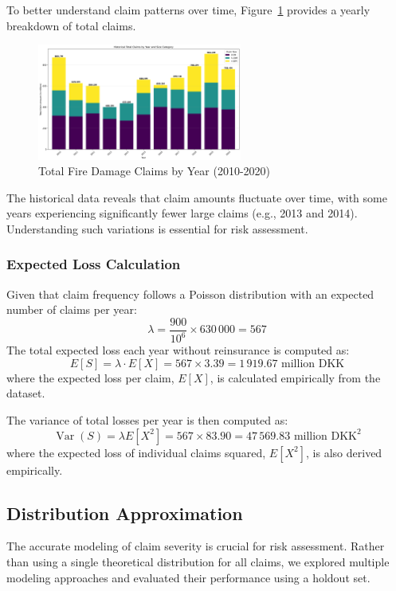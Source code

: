 \documentclass[8pt]{article}
\begin{document}
To better understand claim patterns over time, Figure~\ref{fig:historical-year} provides a yearly breakdown of total claims.

\begin{figure}[h]
    \centering
    \includegraphics[width=0.6\textwidth]{Figures/historical_year_comparison.png}
    \caption{Total Fire Damage Claims by Year (2010-2020)}
    \label{fig:historical-year}
\end{figure}

The historical data reveals that claim amounts fluctuate over time, with some years experiencing significantly fewer large claims (e.g., 2013 and 2014). Understanding such variations is essential for risk assessment.

\subsubsection{Expected Loss Calculation}
Given that claim frequency follows a Poisson distribution with an expected number of claims per year:
\[
\lambda = \frac{900}{10^6} \times 630\,000 = 567
\]
The total expected loss each year without reinsurance is computed as:
\[
E[S] = \lambda \cdot E[X] = 567 \times 3.39 = 1\,919.67 \text{ million DKK}
\]
where the expected loss per claim, $E[X]$, is calculated empirically from the dataset.

The variance of total losses per year is then computed as:
\[
\operatorname{Var}(S) = \lambda E[X^2] = 567 \times 83.90 = 47\,569.83 \text{ million DKK}^2
\]
where the expected loss of individual claims squared, $E[X^2]$, is also derived empirically.


\subsection{Distribution Approximation}
The accurate modeling of claim severity is crucial for risk assessment. Rather than using a single theoretical distribution for all claims, we explored multiple modeling approaches and evaluated their performance using a holdout set.
\end{document}

